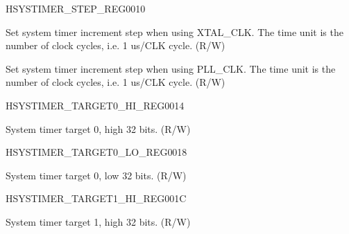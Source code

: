 \begin{register}{H}{SYSTIMER\_STEP\_REG}{\hexprefix{}0010}\label{regdesc:SYSTIMERSTEPREG}
%
%
%
\regnewline%
\begin{regdesc}\begin{reglist}
\label{fielddesc:SYSTIMERTIMERXTALSTEP}\item [SYSTIMER\_TIMER\_XTAL\_STEP] Set system timer increment step when using XTAL\_CLK. The time unit is the number of clock cycles, i.e. 1 us/CLK cycle. (R/W)
\label{fielddesc:SYSTIMERTIMERPLLSTEP}\item [SYSTIMER\_TIMER\_PLL\_STEP] Set system timer increment step when using PLL\_CLK. The time unit is the number of clock cycles, i.e. 1 us/CLK cycle. (R/W)
\end{reglist}\end{regdesc}
\end{register}


\begin{register}{H}{SYSTIMER\_TARGET0\_HI\_REG}{\hexprefix{}0014}\label{regdesc:SYSTIMERTARGET0HIREG}
%
\regnewline%
\begin{regdesc}\begin{reglist}
\label{fielddesc:SYSTIMERTIMERTARGET0HI}\item [SYSTIMER\_TIMER\_TARGET0\_HI] System timer target 0, high 32 bits. (R/W)
\end{reglist}\end{regdesc}
\end{register}


\begin{register}{H}{SYSTIMER\_TARGET0\_LO\_REG}{\hexprefix{}0018}\label{regdesc:SYSTIMERTARGET0LOREG}
%
\regnewline%
\begin{regdesc}\begin{reglist}
\label{fielddesc:SYSTIMERTIMERTARGET0LO}\item [SYSTIMER\_TIMER\_TARGET0\_LO] System timer target 0, low 32 bits. (R/W)
\end{reglist}\end{regdesc}
\end{register}


\begin{register}{H}{SYSTIMER\_TARGET1\_HI\_REG}{\hexprefix{}001C}\label{regdesc:SYSTIMERTARGET1HIREG}
%
\regnewline%
\begin{regdesc}\begin{reglist}
\label{fielddesc:SYSTIMERTIMERTARGET1HI}\item [SYSTIMER\_TIMER\_TARGET1\_HI] System timer target 1, high 32 bits. (R/W)
\end{reglist}\end{regdesc}
\end{register}


